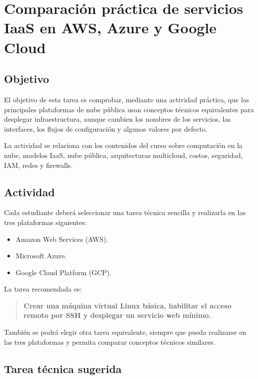 \documentclass[
  coursetitle={Cómputo Nube y Tecnologías Emergentes},
  coursehours={96},
  coursedate={Verano 2026},
  doctype={Tarea 1},
  otherlangs={english,french},
  authorname={Lázaro},
  authorsurname={Bustio-Martínez},
  authortitle={PhD},
  role={Profesor Investigador},
  email={lbustio@inaoe.mx},
  phone={5559504000},
  ext={7459},
  institution={Instituto Nacional de Astrofísica, Óptica y Electrónica (INAOE)},
  department={Maestría en Ciencias en Tecnologías de Seguridad},
  address={Luis Enrique Erro 1, Sta. Ma. Tonantzintla, San Andrés Cholula, CP 72840, Puebla, México},
  margin={0.5in}
]{../../../lbustio_lecture_notes}
\begin{document}
\IberoCover

\section{Comparación práctica de servicios IaaS en AWS, Azure y Google Cloud}
\label{sec:tarea-iaas-aws-azure-gcp}

\subsection{Objetivo}
\label{sec:tarea1-objetivo}

El objetivo de esta tarea es comprobar, mediante una actividad práctica, que las principales plataformas de nube pública usan conceptos técnicos equivalentes para desplegar infraestructura, aunque cambien los nombres de los servicios, las interfaces, los flujos de configuración y algunos valores por defecto.

La actividad se relaciona con los contenidos del curso sobre computación en la nube, modelos IaaS, nube pública, arquitecturas multicloud, costos, seguridad, IAM, redes y firewalls.

\subsection{Actividad}
\label{sec:tarea1-actividad}

Cada estudiante deberá seleccionar una tarea técnica sencilla y realizarla en las tres plataformas siguientes:

\begin{itemize}
  \item Amazon Web Services (AWS).
  \item Microsoft Azure.
  \item Google Cloud Platform (GCP).
\end{itemize}

La tarea recomendada es:

\begin{quote}
\textbf{Crear una máquina virtual Linux básica, habilitar el acceso remoto por SSH y desplegar un servicio web mínimo.}
\end{quote}

También se podrá elegir otra tarea equivalente, siempre que pueda realizarse en las tres plataformas y permita comparar conceptos técnicos similares.

\subsection{Tarea técnica sugerida}
\label{sec:tarea1-tarea-tecnica}
\end{document}
